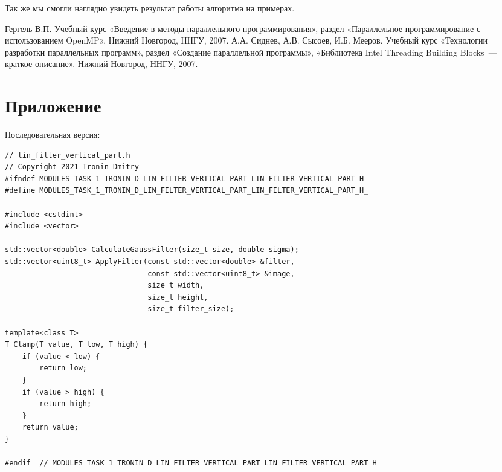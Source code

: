 \documentclass{report}
\begin{document}
Так же мы смогли наглядно увидеть результат работы алгоритма на примерах.

\newpage

\begin{thebibliography}{1}
 Гергель В.П. Учебный курс «Введение в методы параллельного программирования», раздел «Параллельное программирование с использованием OpenMP». Нижний Новгород, ННГУ, 2007.
 А.А. Сиднев, А.В. Сысоев, И.Б. Мееров. Учебный курс «Технологии разработки параллельных программ», раздел «Создание параллельной программы», «Библиотека Intel Threading Building Blocks~--- краткое описание». Нижний Новгород, ННГУ, 2007. 
\end{thebibliography}

\newpage

\section*{Приложение}


Последовательная версия:

\begin{lstlisting}[breaklines=true]
// lin_filter_vertical_part.h
// Copyright 2021 Tronin Dmitry
#ifndef MODULES_TASK_1_TRONIN_D_LIN_FILTER_VERTICAL_PART_LIN_FILTER_VERTICAL_PART_H_
#define MODULES_TASK_1_TRONIN_D_LIN_FILTER_VERTICAL_PART_LIN_FILTER_VERTICAL_PART_H_

#include <cstdint>
#include <vector>

std::vector<double> CalculateGaussFilter(size_t size, double sigma);
std::vector<uint8_t> ApplyFilter(const std::vector<double> &filter,
                                 const std::vector<uint8_t> &image,
                                 size_t width,
                                 size_t height,
                                 size_t filter_size);

template<class T>
T Clamp(T value, T low, T high) {
    if (value < low) {
        return low;
    }
    if (value > high) {
        return high;
    }
    return value;
}

#endif  // MODULES_TASK_1_TRONIN_D_LIN_FILTER_VERTICAL_PART_LIN_FILTER_VERTICAL_PART_H_

\end{lstlisting}
\end{document}

